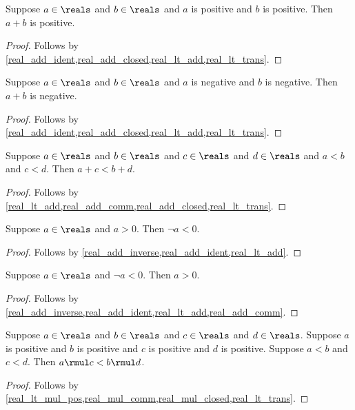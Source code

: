 \begin{proposition}\label{real_pos_add}
    Suppose $a\in\reals$ and $b\in\reals$ and $a$ is positive and $b$ is positive.
    Then $a + b$ is positive.
\end{proposition}
\begin{proof}
    Follows by \cref{real_add_ident,real_add_closed,real_lt_add,real_lt_trans}.
\end{proof}

\begin{proposition}\label{real_neg_add}
    Suppose $a\in\reals$ and $b\in\reals$ and $a$ is negative and $b$ is negative.
    Then $a + b$ is negative.
\end{proposition}
\begin{proof}
    Follows by \cref{real_add_ident,real_add_closed,real_lt_add,real_lt_trans}.
\end{proof}

\begin{proposition}\label{real_lt_add_two}
    Suppose $a\in\reals$ and $b\in\reals$ and $c\in\reals$ and $d\in\reals$ and $a < b$ and $c < d$.
    Then $a + c < b + d$.
\end{proposition}
\begin{proof}
    Follows by \cref{real_lt_add,real_add_comm,real_add_closed,real_lt_trans}.
\end{proof}

\begin{proposition}\label{real_pos_imp_neg}
    Suppose $a\in\reals$ and $a > 0$.
    Then $\neg{a} < 0$.
\end{proposition}
\begin{proof}
    Follows by \cref{real_add_inverse,real_add_ident,real_lt_add}.
\end{proof}

\begin{proposition}\label{real_neg_imp_pos}
    Suppose $a\in\reals$ and $\neg{a} < 0$.
    Then $a > 0$.
\end{proposition}
\begin{proof}
    Follows by \cref{real_add_inverse,real_add_ident,real_lt_add,real_add_comm}.
\end{proof}

\begin{proposition}\label{real_lt_mul_pos_two}
    Suppose $a\in\reals$ and $b\in\reals$ and $c\in\reals$ and $d\in\reals$.
    Suppose $a$ is positive and $b$ is positive and $c$ is positive and $d$ is positive.
    Suppose $a < b$ and $c < d$.
    Then $a \rmul c < b \rmul d$.
\end{proposition}
\begin{proof}
    Follows by \cref{real_lt_mul_pos,real_mul_comm,real_mul_closed,real_lt_trans}.
\end{proof}

